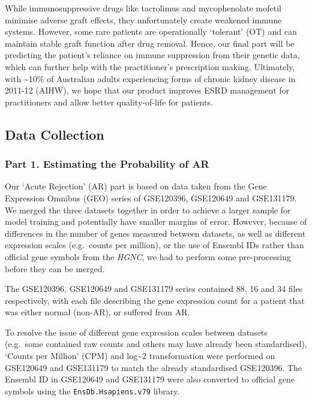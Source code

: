 \documentclass[a4paper,9pt,twocolumn,twoside,]{pinp}
\begin{document}
While immunosuppressive drugs like tacrolimus and mycophenolate mofetil
minimise adverse graft effects, they unfortunately create weakened
immune systems. However, some rare patients are operationally `tolerant'
(OT) and can maintain stable graft function after drug removal. Hence,
our final part will be predicting the patient's reliance on immune
suppression from their genetic data, which can further help with the
practitioner's prescription making. Ultimately, with
\textasciitilde{}10\% of Australian adults experiencing forms of chronic
kidney disease in 2011-12 (AIHW), we hope that our product improves ESRD
management for practitioners and allow better quality-of-life for
patients.

\hypertarget{data-collection}{%
\subsection{Data Collection}\label{data-collection}}

\hypertarget{part-1.-estimating-the-probability-of-ar}{%
\subsubsection{Part 1. Estimating the Probability of
AR}\label{part-1.-estimating-the-probability-of-ar}}

Our `Acute Rejection' (AR) part is based on data taken from the Gene
Expression Omnibus (GEO) series of GSE120396, GSE120649 and GSE131179.
We merged the three datasets together in order to achieve a larger
sample for model training and potentially have smaller margins of error.
However, because of differences in the number of genes measured between
datasets, as well as different expression scales (e.g.~counts per
million), or the use of Ensembl IDs rather than official gene symbols
from the \emph{HGNC}, we had to perform some pre-processing before they
can be merged.

The GSE120396, GSE120649 and GSE131179 series contained 88, 16 and 34
files respectively, with each file describing the gene expression count
for a patient that was either normal (non-AR), or suffered from AR.

To resolve the issue of different gene expression scales between
datasets (e.g.~some contained raw counts and others may have already
been standardised), `Counts per Million' (CPM) and log\textasciitilde{}2
transformation were performed on GSE120649 and GSE131179 to match the
already standardised GSE120396. The Ensembl ID in GSE120649 and
GSE131179 were also converted to official gene symbols using the
\texttt{EnsDb.Hsapiens.v79} library.
\end{document}
